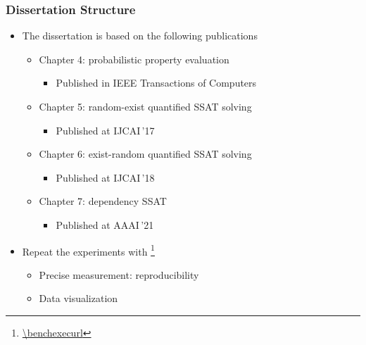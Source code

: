\begin{frame}
      \frametitle{Dissertation Structure}
      \begin{itemize}
            \item The dissertation is based on the following publications
                  \pause
                  \begin{itemize}
                        \item Chapter 4: probabilistic property evaluation
                              \pause
                              \begin{itemize}
                                    \item Published in IEEE Transactions of Computers~\cite{LeeTC18ProbDesign}
                                          \pause
                              \end{itemize}
                        \item Chapter 5: random-exist quantified SSAT solving
                              \pause
                              \begin{itemize}
                                    \item Published at IJCAI\,'17~\cite{LeeIJCAI17RESSAT}
                                          \pause
                              \end{itemize}
                        \item Chapter 6: exist-random quantified SSAT solving
                              \pause
                              \begin{itemize}
                                    \item Published at IJCAI\,'18~\cite{LeeIJCAI18ERSSAT}
                                          \pause
                              \end{itemize}
                        \item Chapter 7: dependency SSAT
                              \pause
                              \begin{itemize}
                                    \item Published at AAAI\,'21~\cite{LeeAAAI21DSSAT}
                                          \pause
                              \end{itemize}
                  \end{itemize}
            \item Repeat the experiments with \benchexec\footnote{\url{\benchexecurl}}
                  \pause
                  \begin{itemize}
                        \item Precise measurement: reproducibility
                              \pause
                        \item Data visualization
                  \end{itemize}
      \end{itemize}
\end{frame}